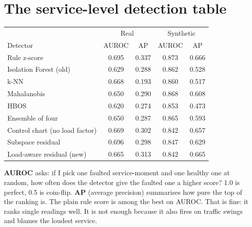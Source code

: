 \section{The service-level detection table}
\begin{center}
\small
\begin{tabular}{lcccc}
\toprule
 & \multicolumn{2}{c}{Real} & \multicolumn{2}{c}{Synthetic}\\
Detector & AUROC & AP & AUROC & AP\\
\midrule
Rule z-score & 0.695 & 0.337 & 0.873 & 0.666\\
Isolation Forest (old) & 0.629 & 0.288 & 0.862 & 0.528\\
k-NN & 0.668 & 0.193 & 0.860 & 0.517\\
Mahalanobis & 0.650 & 0.290 & 0.868 & 0.608\\
HBOS & 0.620 & 0.274 & 0.853 & 0.473\\
Ensemble of four & 0.650 & 0.287 & 0.865 & 0.593\\
Control chart (no load factor) & 0.669 & 0.302 & 0.842 & 0.657\\
Subspace residual & 0.696 & 0.298 & 0.847 & 0.629\\
Load-aware residual (new) & 0.665 & 0.313 & 0.842 & 0.665\\
\bottomrule
\end{tabular}
\end{center}
\begin{simplebox}
\textbf{AUROC} asks: if I pick one faulted service-moment and one healthy one at random, how often does the detector give the faulted one a higher score? 1.0 is perfect, 0.5 is coin-flip. \textbf{AP} (average precision) summarises how pure the top of the ranking is. The plain rule score is among the best on AUROC. That is fine: it ranks single readings well. It is not enough because it also fires on traffic swings and blames the loudest service.
\end{simplebox}

